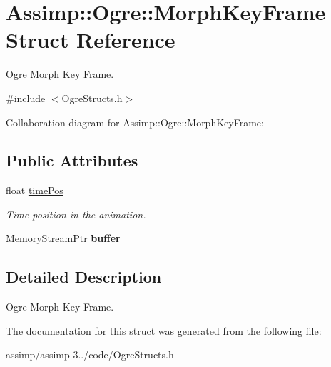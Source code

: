 \hypertarget{struct_assimp_1_1_ogre_1_1_morph_key_frame}{\section{Assimp\+:\+:Ogre\+:\+:Morph\+Key\+Frame Struct Reference}
\label{struct_assimp_1_1_ogre_1_1_morph_key_frame}
}


Ogre Morph Key Frame.  




{\ttfamily \#include $<$Ogre\+Structs.\+h$>$}



Collaboration diagram for Assimp\+:\+:Ogre\+:\+:Morph\+Key\+Frame\+:
\subsection*{Public Attributes}
\begin{DoxyCompactItemize}
\item 
\hypertarget{struct_assimp_1_1_ogre_1_1_morph_key_frame_a4e7572dc210f6ddc2a394647e4fce1f2}{float \hyperlink{struct_assimp_1_1_ogre_1_1_morph_key_frame_a4e7572dc210f6ddc2a394647e4fce1f2}{time\+Pos}}\label{struct_assimp_1_1_ogre_1_1_morph_key_frame_a4e7572dc210f6ddc2a394647e4fce1f2}

\begin{DoxyCompactList}\small\item\em Time position in the animation. \end{DoxyCompactList}\item 
\hypertarget{struct_assimp_1_1_ogre_1_1_morph_key_frame_ac6e977bddcc13b82136edb86caa1bb5f}{\hyperlink{classboost_1_1shared__ptr}{Memory\+Stream\+Ptr} {\bfseries buffer}}\label{struct_assimp_1_1_ogre_1_1_morph_key_frame_ac6e977bddcc13b82136edb86caa1bb5f}

\end{DoxyCompactItemize}


\subsection{Detailed Description}
Ogre Morph Key Frame. 

The documentation for this struct was generated from the following file\+:\begin{DoxyCompactItemize}
\item 
assimp/assimp-\/3../code/Ogre\+Structs.\+h\end{DoxyCompactItemize}
